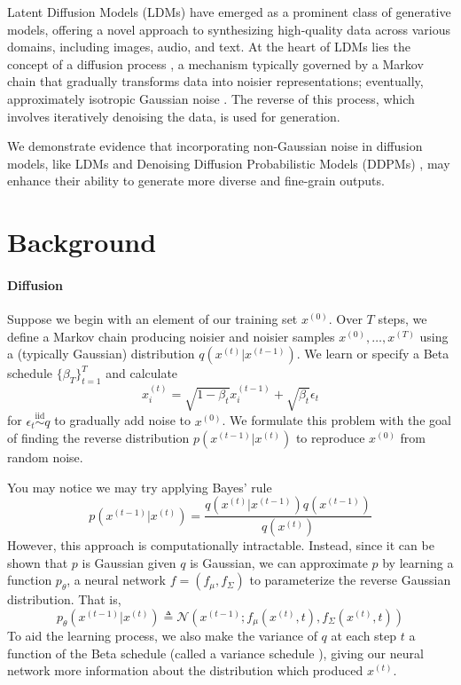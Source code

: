\documentclass[10pt,twocolumn,letterpaper]{article}
\begin{document}
Latent Diffusion Models (LDMs) \cite{DBLP:journals/corr/abs-2112-10752} have emerged as a prominent class of generative models, offering a novel approach to synthesizing high-quality data across various domains, including images, audio, and text. At the heart of LDMs lies the concept of a diffusion process \cite{DBLP:journals/corr/Sohl-DicksteinW15}, a mechanism typically governed by a Markov chain that gradually transforms data into noisier representations; eventually, approximately isotropic Gaussian noise \cite{DBLP:journals/corr/Sohl-DicksteinW15}. The reverse of this process, which involves iteratively denoising the data, is used for generation.

We demonstrate evidence that incorporating non-Gaussian noise in diffusion models, like LDMs and Denoising Diffusion Probabilistic Models (DDPMs) \cite{DBLP:journals/corr/abs-2006-11239}, may enhance their ability to generate more diverse and fine-grain outputs.

\section{Background}
\label{sec:intro}

\paragraph{\textbf{Diffusion}} Suppose we begin with an element of our training set $x^{(0)}$. Over $T$ steps, we define a Markov chain producing noisier and noisier samples $x^{(0)},\ldots,x^{(T)}$ using a (typically Gaussian) distribution $q(x^{(t)}|x^{(t-1)})$. We learn or specify a Beta schedule $\{\beta_T\}_{t=1}^T$ and calculate
\begin{equation}
    x^{(t)}_i=\sqrt{1-\beta_t}x^{(t-1)}_i+\sqrt{\beta_t}\epsilon_t
\end{equation}
for $\epsilon_t \overset{\text{iid}}{\sim} q$ to gradually add noise to $x^{(0)}$. We formulate this problem with the goal of finding the reverse distribution $p(x^{(t-1)}|x^{(t)})$ to reproduce $x^{(0)}$ from random noise. 

You may notice we may try applying Bayes' rule
\begin{equation}
    p(x^{(t-1)}|x^{(t)})=\frac{q(x^{(t)}|x^{(t-1)})q(x^{(t-1)})}{q(x^{(t)})}
\end{equation}
However, this approach is computationally intractable. Instead, since it can be shown that $p$ is Gaussian given $q$ is Gaussian\cite{DBLP:journals/corr/Sohl-DicksteinW15}, we can approximate $p$ by learning a function $p_{\theta}$, a neural network $f=(f_{\mu},f_{\Sigma})$ to parameterize the reverse Gaussian distribution. That is,
\begin{equation}
    p_{\theta}(x^{(t-1)}|x^{(t)})\triangleq\mathcal{N}(x^{(t-1)};f_{\mu}(x^{(t)},t),f_{\Sigma}(x^{(t)},t))
\end{equation}
To aid the learning process, we also make the variance of $q$ at each step $t$ a function of the Beta schedule (called a variance schedule \cite{DBLP:journals/corr/Sohl-DicksteinW15}), giving our neural network more information about the distribution which produced $x^{(t)}$.
\end{document}
